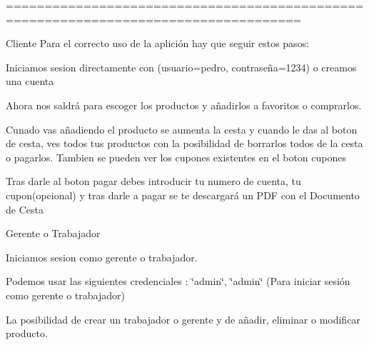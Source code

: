 ====================================================================================

Cliente Para el correcto uso de la aplición hay que seguir estos pasos\+:


\begin{DoxyEnumerate}
\item Iniciamos sesion directamente con (usuario=pedro, contraseña=1234) o creamos una cuenta
\item Ahora nos saldrá para escoger los productos y añadirlos a favoritos o comprarlos.
\item Cunado vas añadiendo el producto se aumenta la cesta y cuando le das al boton de cesta, ves todos tus productos con la posibilidad de borrarlos todos de la cesta o pagarlos. Tambien se pueden ver los cupones existentes en el boton cupones
\item Tras darle al boton pagar debes introducir tu numero de cuenta, tu cupon(opcional) y tras darle a pagar se te descargará un PDF con el Documento de Cesta
\end{DoxyEnumerate}



Gerente o Trabajador
\begin{DoxyEnumerate}
\item Iniciamos sesion como gerente o trabajador.
\item Podemos usar las siguientes credenciales \+: \char`\"{}admin\char`\"{}, \char`\"{}admin\char`\"{} (Para iniciar sesión como gerente o trabajador)
\item La posibilidad de crear un trabajador o gerente y de añadir, eliminar o modificar producto. 
\end{DoxyEnumerate}